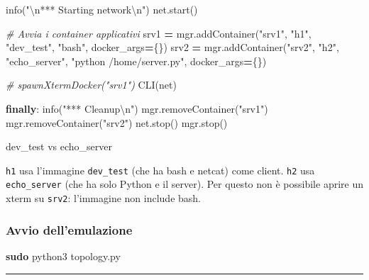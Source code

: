 \documentclass[
  italian,
  openany]{book}
\newenvironment{Shaded}{\begin{snugshade}}{\end{snugshade}}
\newcommand{\CharTok}[1]{\textcolor[rgb]{0.31,0.60,0.02}{#1}}
\newcommand{\CommentTok}[1]{\textcolor[rgb]{0.56,0.35,0.01}{\textit{#1}}}
\newcommand{\ControlFlowTok}[1]{\textcolor[rgb]{0.13,0.29,0.53}{\textbf{#1}}}
\newcommand{\FunctionTok}[1]{\textcolor[rgb]{0.13,0.29,0.53}{\textbf{#1}}}
\newcommand{\NormalTok}[1]{#1}
\newcommand{\OperatorTok}[1]{\textcolor[rgb]{0.81,0.36,0.00}{\textbf{#1}}}
\newcommand{\StringTok}[1]{\textcolor[rgb]{0.31,0.60,0.02}{#1}}
\begin{document}
\begin{Shaded}
\begin{Highlighting}[]
\NormalTok{    info(}\StringTok{"}\CharTok{\textbackslash{}n}\StringTok{*** Starting network}\CharTok{\textbackslash{}n}\StringTok{"}\NormalTok{)}
\NormalTok{    net.start()}

    \CommentTok{\# Avvia i container applicativi}
\NormalTok{    srv1 }\OperatorTok{=}\NormalTok{ mgr.addContainer(}\StringTok{"srv1"}\NormalTok{, }\StringTok{"h1"}\NormalTok{, }\StringTok{"dev\_test"}\NormalTok{, }\StringTok{"bash"}\NormalTok{, docker\_args}\OperatorTok{=}\NormalTok{\{\})}
\NormalTok{    srv2 }\OperatorTok{=}\NormalTok{ mgr.addContainer(}\StringTok{"srv2"}\NormalTok{, }\StringTok{"h2"}\NormalTok{, }\StringTok{"echo\_server"}\NormalTok{,}
           \StringTok{"python /home/server.py"}\NormalTok{, docker\_args}\OperatorTok{=}\NormalTok{\{\})}

    \CommentTok{\# spawnXtermDocker("srv1")}
\NormalTok{    CLI(net)}

\ControlFlowTok{finally}\NormalTok{:}
\NormalTok{    info(}\StringTok{"*** Cleanup}\CharTok{\textbackslash{}n}\StringTok{"}\NormalTok{)}
\NormalTok{    mgr.removeContainer(}\StringTok{"srv1"}\NormalTok{)}
\NormalTok{    mgr.removeContainer(}\StringTok{"srv2"}\NormalTok{)}
\NormalTok{    net.stop()}
\NormalTok{    mgr.stop()}
\end{Highlighting}
\end{Shaded}

\begin{calloutnote}{dev\_test vs echo\_server}

\texttt{h1} usa l'immagine \texttt{dev\_test} (che ha bash e netcat)
come client. \texttt{h2} usa \texttt{echo\_server} (che ha solo Python e
il server). Per questo non è possibile aprire un xterm su \texttt{srv2}:
l'immagine non include bash.

\end{calloutnote}

\subsubsection{Avvio dell'emulazione}\label{avvio-dellemulazione}

\begin{Shaded}
\begin{Highlighting}[]
\FunctionTok{sudo}\NormalTok{ python3 topology.py}
\end{Highlighting}
\end{Shaded}

\begin{center}\rule{0.5\linewidth}{0.5pt}\end{center}
\end{document}
